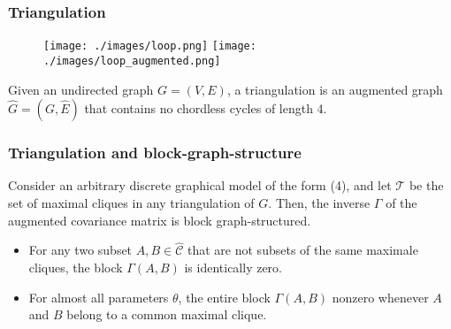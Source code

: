\documentclass{beamer}
\begin{document}
\begin{frame}
\begin{overlayarea}{10cm}{5cm}
\begin{center}
\end{center}
\end{overlayarea}

\end{frame}

\begin{frame}
\frametitle{Triangulation}

\begin{figure}
\begin{center}
\texttt{[image: ./images/loop.png]}
\texttt{[image: ./images/loop\_augmented.png]}
\end{center}
\end{figure}

\begin{definition}
Given an undirected graph $G = (V, E)$, a triangulation is an augmented graph
$\hat{G} = (G, \hat{E})$ that contains no chordless cycles of length 4.
\end{definition}
\end{frame}

\begin{frame}
\frametitle{Triangulation and block-graph-structure}

\begin{theorem}
Consider an  arbitrary discrete graphical model of the form (4), and let
$\mathcal{T}$ be the set of maximal cliques in any triangulation of $G$. Then,
the inverse $\Gamma$ of the augmented covariance matrix is block
graph-structured.
\begin{itemize}
\item For any two subset $A, B \in \hat{\mathcal{C}}$ that are not subsets of
the same maximale cliques, the block $\Gamma(A, B)$ is identically zero.
\item For almost all parameters $\theta$, the entire block $\Gamma(A, B)$
nonzero whenever $A$ and $B$ belong to a common maximal clique.
\end{itemize}
\end{theorem}
\end{frame}
\end{document}
